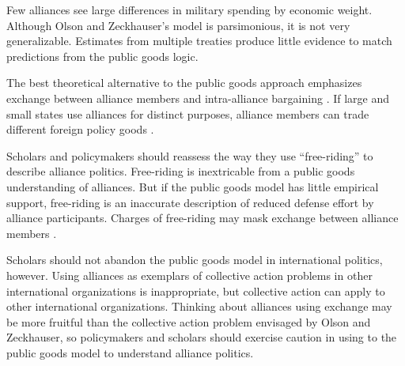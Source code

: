 \documentclass[12pt]{article}
\begin{document}
Few alliances see large differences in military spending by economic weight. 
Although Olson and Zeckhauser's model is parsimonious, it is not very generalizable. 
Estimates from multiple treaties produce little evidence to match predictions from the public goods logic. 


The best theoretical alternative to the public goods approach emphasizes exchange between alliance members and intra-alliance bargaining \citep{Norrlof2010, Brooksetal2013, Kim2016}. 
If large and small states use alliances for distinct purposes, alliance members can trade different foreign policy goods \citep{Morrow1991, Johnson2015}. 


Scholars and policymakers should reassess the way they use ``free-riding'' to describe alliance politics. 
Free-riding is inextricable from a public goods understanding of alliances.
But if the public goods model has little empirical support, free-riding is an inaccurate description of reduced defense effort by alliance participants.  
Charges of free-riding may mask exchange between alliance members \citep{Lanoszka2015}. 


Scholars should not abandon the public goods model in international politics, however.   
Using alliances as exemplars of collective action problems in other international organizations is inappropriate, but collective action can apply to other international organizations. 
Thinking about alliances using exchange may be more fruitful than the collective action problem envisaged by Olson and Zeckhauser, so policymakers and scholars should exercise caution in using to the public goods model to understand alliance politics.  



\singlespace


 
\end{document}
